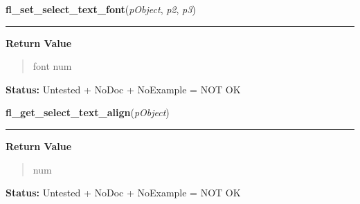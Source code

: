     \label{xformslib:library:fl_set_select_text_font}

    \vspace{0.5ex}

\hspace{.8\funcindent}\begin{boxedminipage}{\funcwidth}

    \raggedright \textbf{fl\_set\_select\_text\_font}(\textit{pObject}, \textit{p2}, \textit{p3})

    \vspace{-1.5ex}

    \rule{\textwidth}{0.5\fboxrule}
\setlength{\parskip}{2ex}
\setlength{\parskip}{1ex}
      \textbf{Return Value}
    \vspace{-1ex}

      \begin{quote}
      font num

      \end{quote}

\textbf{Status:} Untested + NoDoc + NoExample = NOT OK



    \end{boxedminipage}

    \label{xformslib:library:fl_get_select_text_align}

    \vspace{0.5ex}

\hspace{.8\funcindent}\begin{boxedminipage}{\funcwidth}

    \raggedright \textbf{fl\_get\_select\_text\_align}(\textit{pObject})

    \vspace{-1.5ex}

    \rule{\textwidth}{0.5\fboxrule}
\setlength{\parskip}{2ex}
\setlength{\parskip}{1ex}
      \textbf{Return Value}
    \vspace{-1ex}

      \begin{quote}
      num

      \end{quote}

\textbf{Status:} Untested + NoDoc + NoExample = NOT OK



    \end{boxedminipage}

